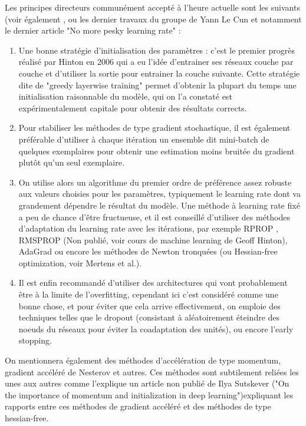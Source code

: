 \documentclass[conference]{IEEEtran}
\begin{document}
Les principes directeurs communément accepté à l'heure actuelle sont les suivants (voir également \cite{DBLP:journals/corr/abs-1206-5533}, ou les dernier travaux du groupe de Yann Le Cun et notamment le dernier article "No more pesky learning rate" : 
\begin{enumerate}
\item Une bonne stratégie d'initialisation des paramètres : c'est le premier progrès réalisé par Hinton en 2006 qui a eu l'idée d'entrainer ses réseaux couche par couche et d'utiliser la sortie pour entrainer la couche suivante. Cette stratégie dite de "greedy layerwise training" permet d'obtenir la plupart du temps une initialisation raisonnable du modèle, qui on l'a constaté est expérimentalement capitale pour obtenir des résultats corrects.
\item Pour stabiliser les méthodes de type gradient stochastique, il est également préférable d'utiliser à chaque itération un ensemble dit mini-batch de quelques exemplaires pour obtenir une estimation moins bruitée du gradient plutôt qu'un seul exemplaire.
\item On utilise alors un algorithme du premier ordre de préférence assez robuste aux valeurs choisies pour les paramètres, typiquement le learning rate dont va grandement dépendre le résultat du modèle. Une méthode à learning rate fixé a peu de chance d'être fructueuse, et il est conseillé d'utiliser des méthodes d'adaptation du learning rate avec les itérations, par exemple RPROP \cite{Riedmiller93adirect}, RMSPROP (Non publié, voir cours de machine learning de Geoff Hinton), AdaGrad \cite{Duchi:2011:ASM:1953048.2021068} ou encore les méthodes de Newton tronquées (ou Hessian-free optimization, voir Mertens et al.\cite{conf/icml/Martens10}).
\item Il est enfin recommandé d'utiliser des architectures qui vont probablement être à la limite de l'overfitting, cependant ici c'est considéré comme une bonne chose, et pour éviter que cela arrive effectivement, on emploie des techniques telles que le dropout (consistant à aléatoirement éteindre des noeuds du réseaux pour éviter la coadaptation des unités), ou encore l'early stopping.
\end{enumerate}

On mentionnera également des méthodes d'accélération de type momentum, gradient accéléré de Nesterov et autres. Ces méthodes sont subtilement reliées les unes aux autres comme l'explique un article non publié de Ilya Sutskever ("On the importance of momentum and initialization in deep learning")expliquant les rapports entre ces méthodes de gradient accéléré et des méthodes de type hessian-free. 
\end{document}
